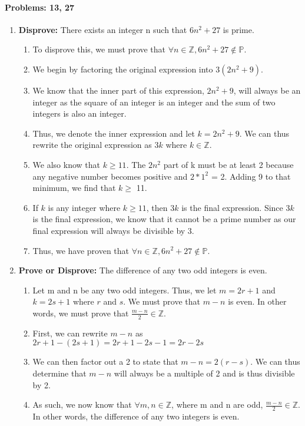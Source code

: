 \documentclass{article}
\makeatletter
\newcommand\setItemnumber[1]{\setcounter{enum\romannumeral\@enumdepth}{\numexpr#1-1\relax}}
\makeatother
\begin{document}
\paragraph{Problems: 13, 27}
\begin{enumerate}
    \setItemnumber{13}
    \item \textbf{Disprove: }There exists an integer n such that $6n^2+27$ is prime. \\
    \begin{enumerate}
        \item To disprove this, we must prove that $\forall n\in\mathbb{Z}, 6n^2+27\not\in\mathbb{P}$.
        \item We begin by factoring the original expression into $3(2n^2+9)$.
        \item We know that the inner part of this expression, $2n^2+9$, will always be an integer as the square of an integer is an integer and the sum of two integers is also an integer.
        \item Thus, we denote the inner expression and let $k = 2n^2+9$. We can thus rewrite the original expression as $3k$ where $k\in\mathbb{Z}$. 
        \item We also know that $k\geq11$. The $2n^2$ part of k must be at least 2 because any negative number becomes positive and $2*1^2$ = 2. Adding 9 to that minimum, we find that $k\geq$ 11.
        \item If $k$ is any integer where $k\geq 11$, then $3k$ is the final expression. Since $3k$ is the final expression, we know that it cannot be a prime number as our final expression will always be divisible by 3.
        \item Thus, we have proven that $\forall n \in\mathbb{Z}, 6n^2+27\not\in\mathbb{P}$.
    \end{enumerate}
    \setItemnumber{27}
    \item \textbf{Prove or Disprove: }The difference of any two odd integers is even.
    \begin{enumerate}
        \item Let m and n be any two odd integers. Thus, we let $m = 2r+1$ and $k=2s+1$ where $r$ and $s$. We must prove that $m-n$ is even. In other words, we must prove that $\frac{m-n}{2} \in\mathbb{Z}$.
        \item First, we can rewrite $m-n$ as $2r+1-(2s+1) = 2r+1-2s-1 = 2r-2s$
        \item We can then factor out a 2 to state that $m-n = 2(r-s)$. We can thus determine that $m-n$ will always be a multiple of 2 and is thus divisible by 2.
        \item As such, we now know that $\forall m,n\in\mathbb{Z}$, where m and n are odd, $\frac{m-n}{2} \in\mathbb{Z}$. In other words, the difference of any two integers is even.
    \end{enumerate}
\end{enumerate}
\end{document}
